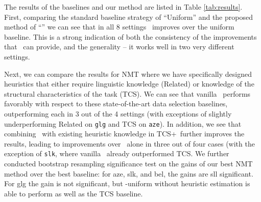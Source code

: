 
The results of the baselines and our method are listed in Table \ref{tab:results}.
First, comparing the standard baseline strategy of ``Uniform'' and the proposed method of ``\dds'' we can see that in all 8 settings \dds~improves over the uniform baseline.
This is a strong indication of both the consistency of the improvements that \dds~can provide, and the generality -- it works well in two very different settings.

Next, we can compare the results for NMT where we have specifically designed heuristics that either require linguistic knowledge (Related) or knowledge of the structural characteristics of the task (TCS).
We can see that vanilla \dds~performs favorably with respect to these state-of-the-art data selection baselines, outperforming each in 3 out of the 4 settings (with exceptions of slightly underperforming Related on \texttt{glg} and TCS on \texttt{aze}).
In addition, we see that combining \dds~with existing heuristic knowledge in TCS+\dds~further improves the results, leading to improvements over \dds~alone in three out of four cases (with the exception of \texttt{slk}, where vanilla \dds~already outperformed TCS.  We further conducted bootstrap resampling significance test on the gains of our best NMT method over the best baseline: for aze, slk, and bel, the gains are sll significant. For glg the gain is not significant, but \dds-uniform without heuristic estimation is able to perform as well as the TCS baseline.
